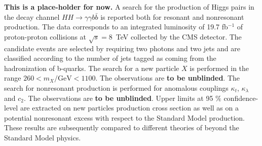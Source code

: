 {\bf This is a place-holder for now.} A search for the production of Higgs pairs in the decay channel
$HH \rightarrow \gamma\gamma b\bar{b}$ is reported both for
resonant and nonresonant production. The data corresponds to an integrated
luminosity of 19.7 fb$^{-1}$ of proton-proton collisions at $\sqrt{s}=8$~TeV collected by the
CMS detector. The candidate events are selected by requiring two photons and two jets and are classified
according to the number of jets tagged as coming from the hadronization of b-quarks.
The search for a new particle $X$ is performed in the range $260 < m_X/\text{GeV} < 1100$.
The observations
are {\bf to be unblinded}.
The search for nonresonant production is performed for anomalous couplings
$\kappa_{t}$, $\kappa_{\lambda}$ and $c_2$.
The observations are {\bf to be unblinded}.
Upper limits at 95 $\%$ confidence-level are extracted on new particles production cross section
as well as on a potential nonresonant excess with respect to the Standard Model production.
These results are subsequently compared to different theories of beyond the Standard Model physics.
